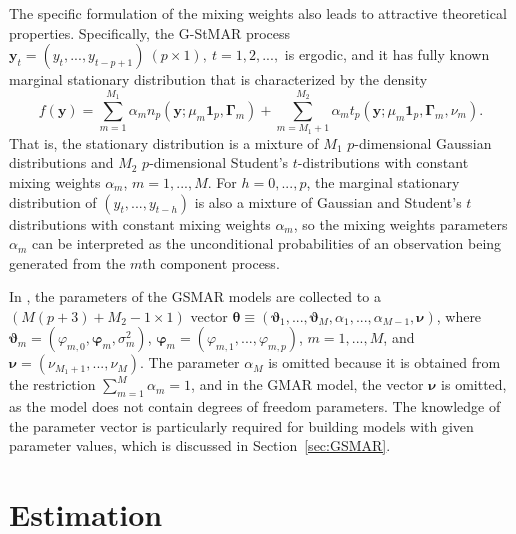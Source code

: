 \documentclass[nojss]{jss} %
\begin{document}
The specific formulation of the mixing weights also leads to attractive theoretical properties. Specifically, the G-StMAR process $\boldsymbol{y}_{t}=(y_{t},...,y_{t-p+1}) \ (p \times 1), \ t=1,2,...,$ is ergodic, and it has fully known marginal stationary distribution that is characterized by the density \citep[][Theorem 1; see the proof of Theorem 1 for the stationary distribution of $1,...,p+1$ consecutive observations]{Virolainen:2020}
\begin{equation}\label{eq:statdist}
f(\boldsymbol{y}) = \sum_{m=1}^{M_1}\alpha_m n_p(\boldsymbol{y};\mu_m\boldsymbol{1}_p,\boldsymbol{\Gamma}_m) + \sum_{m=M_1 + 1}^{M_2}\alpha_m t_p(\boldsymbol{y};\mu_m\boldsymbol{1}_p,\boldsymbol{\Gamma}_m,\nu_m).
\end{equation}
That is, the stationary distribution is a mixture of $M_1$ $p$-dimensional Gaussian distributions and $M_2$ $p$-dimensional Student's $t$-distributions with constant mixing weights $\alpha_m$, $m=1,...,M$. For $h=0,...,p$, the marginal stationary distribution of $(y_t,...,y_{t-h})$ is also a mixture of Gaussian and Student's $t$ distributions with constant mixing weights $\alpha_m$, so the mixing weights parameters $\alpha_m$ can be interpreted as the unconditional probabilities of an observation being generated from the $m$th component process.

In , the parameters of the GSMAR models are collected to a $(M(p+3)+M_2-1\times 1)$ vector $\boldsymbol{\theta} \equiv (\boldsymbol{\vartheta}_1,...,\boldsymbol{\vartheta}_M,\alpha_1,...,\alpha_{M-1},\boldsymbol{\nu})$, where $\boldsymbol{\vartheta}_m=(\varphi_{m,0},\boldsymbol{\varphi}_m,\sigma^2_m)$, $\boldsymbol{\varphi}_m=(\varphi_{m,1},...,\varphi_{m,p})$, $m=1,...,M$, and $\boldsymbol{\nu}=(\nu_{M_1+1},...,\nu_M)$. The parameter $\alpha_M$ is omitted because it is obtained from the restriction $\sum_{m=1}^M\alpha_m=1$, and in the GMAR model, the vector $\boldsymbol{\nu}$ is omitted, as the model does not contain degrees of freedom parameters. The knowledge of the parameter vector is particularly required for building models with given parameter values, which is discussed in Section~\ref{sec:GSMAR}.

\section{Estimation}\label{sec:estimation}
\end{document}
